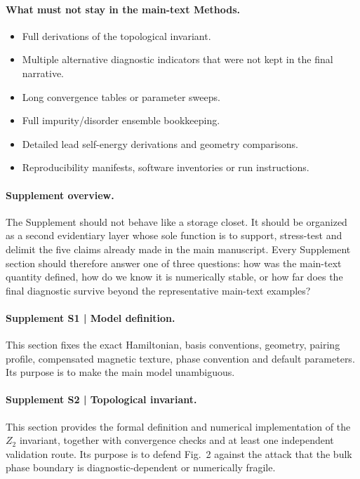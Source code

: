 \paragraph{What must not stay in the main-text Methods.}
\begin{itemize}
\item Full derivations of the topological invariant.
\item Multiple alternative diagnostic indicators that were not kept in the final narrative.
\item Long convergence tables or parameter sweeps.
\item Full impurity/disorder ensemble bookkeeping.
\item Detailed lead self-energy derivations and geometry comparisons.
\item Reproducibility manifests, software inventories or run instructions.
\end{itemize}

\paragraph{Supplement overview.}
The Supplement should not behave like a storage closet. It should be organized as a second evidentiary layer whose sole function is to support, stress-test and delimit the five claims already made in the main manuscript. Every Supplement section should therefore answer one of three questions: how was the main-text quantity defined, how do we know it is numerically stable, or how far does the final diagnostic survive beyond the representative main-text examples?

\paragraph{Supplement S1 | Model definition.}
This section fixes the exact Hamiltonian, basis conventions, geometry, pairing profile, compensated magnetic texture, phase convention and default parameters. Its purpose is to make the main model unambiguous.

\paragraph{Supplement S2 | Topological invariant.}
This section provides the formal definition and numerical implementation of the $Z_2$ invariant, together with convergence checks and at least one independent validation route. Its purpose is to defend Fig.~2 against the attack that the bulk phase boundary is diagnostic-dependent or numerically fragile.

